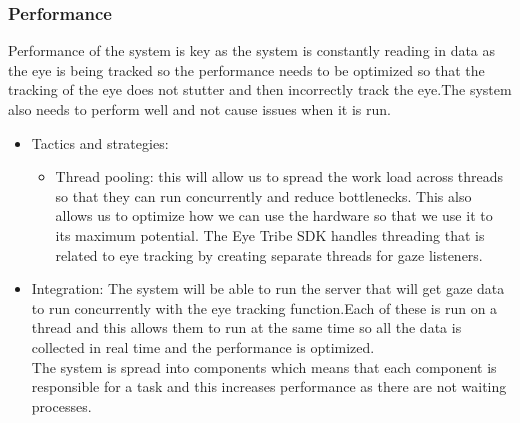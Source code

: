 \subsubsection{Performance}
\begin{flushleft}
Performance of the system is key as the system is constantly reading in data as the eye is being tracked so the performance needs to be optimized so that the tracking of the eye does not stutter and then incorrectly track the eye.The system also needs to perform well and not cause issues when it is run.
\begin{itemize}
\item{Tactics and strategies}:
\begin{itemize}
\item{Thread pooling}: this will allow us to spread the work load across threads so that they can run concurrently and reduce bottlenecks. This also allows us to optimize how we can use the hardware so that we use it to its maximum potential. The Eye Tribe SDK handles threading that is related to eye tracking by creating separate threads for gaze listeners.
\end{itemize}

\item{Integration}: The system will be able to run the server that will get gaze data to run concurrently with the eye tracking function.Each of these is run on a thread and this allows them to run at the same time so all the data is collected in real time and the performance is optimized.\\
The system is spread into components which means that each component is responsible for a task and this increases performance as there are not waiting processes.
\end{itemize}

\end{flushleft}
		

